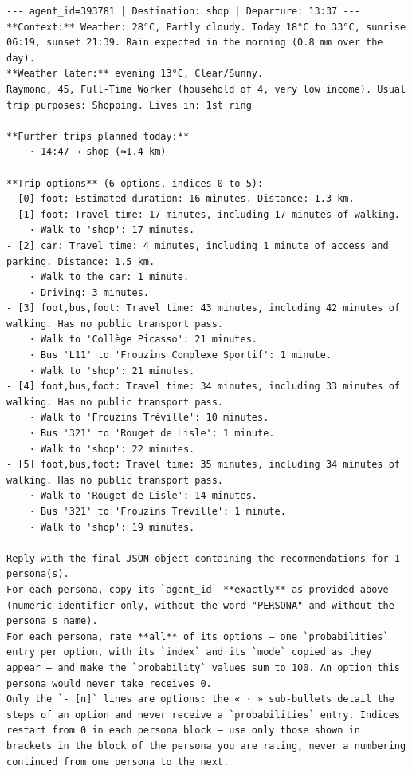 \begin{Verbatim}
--- agent_id=393781 | Destination: shop | Departure: 13:37 ---
**Context:** Weather: 28°C, Partly cloudy. Today 18°C to 33°C, sunrise 06:19, sunset 21:39. Rain expected in the morning (0.8 mm over the day).
**Weather later:** evening 13°C, Clear/Sunny.
Raymond, 45, Full-Time Worker (household of 4, very low income). Usual trip purposes: Shopping. Lives in: 1st ring

**Further trips planned today:**
    · 14:47 → shop (≈1.4 km)

**Trip options** (6 options, indices 0 to 5):
- [0] foot: Estimated duration: 16 minutes. Distance: 1.3 km.
- [1] foot: Travel time: 17 minutes, including 17 minutes of walking.
    · Walk to 'shop': 17 minutes.
- [2] car: Travel time: 4 minutes, including 1 minute of access and parking. Distance: 1.5 km.
    · Walk to the car: 1 minute.
    · Driving: 3 minutes.
- [3] foot,bus,foot: Travel time: 43 minutes, including 42 minutes of walking. Has no public transport pass.
    · Walk to 'Collège Picasso': 21 minutes.
    · Bus 'L11' to 'Frouzins Complexe Sportif': 1 minute.
    · Walk to 'shop': 21 minutes.
- [4] foot,bus,foot: Travel time: 34 minutes, including 33 minutes of walking. Has no public transport pass.
    · Walk to 'Frouzins Tréville': 10 minutes.
    · Bus '321' to 'Rouget de Lisle': 1 minute.
    · Walk to 'shop': 22 minutes.
- [5] foot,bus,foot: Travel time: 35 minutes, including 34 minutes of walking. Has no public transport pass.
    · Walk to 'Rouget de Lisle': 14 minutes.
    · Bus '321' to 'Frouzins Tréville': 1 minute.
    · Walk to 'shop': 19 minutes.

Reply with the final JSON object containing the recommendations for 1 persona(s).
For each persona, copy its `agent_id` **exactly** as provided above (numeric identifier only, without the word "PERSONA" and without the persona's name).
For each persona, rate **all** of its options — one `probabilities` entry per option, with its `index` and its `mode` copied as they appear — and make the `probability` values sum to 100. An option this persona would never take receives 0.
Only the `- [n]` lines are options: the « · » sub-bullets detail the steps of an option and never receive a `probabilities` entry. Indices restart from 0 in each persona block — use only those shown in brackets in the block of the persona you are rating, never a numbering continued from one persona to the next.
\end{Verbatim}

